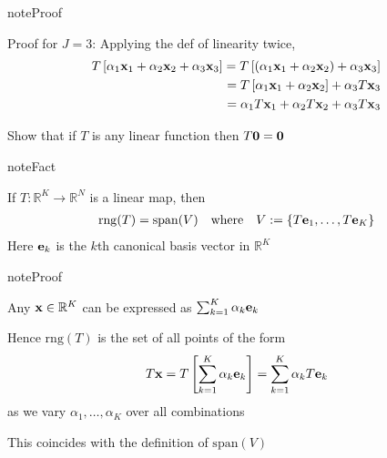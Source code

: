 \documentclass[letterpaper,10pt,english]{jupyterBook}
\begin{document}
\begin{sphinxadmonition}{note}{Proof}

\sphinxAtStartPar
Proof for \(J=3\): Applying the def of linearity twice,
\begin{equation*}
\begin{split}
%
T
\left[ \alpha_1 {\bf x}_1 + \alpha_2 {\bf x}_2 + \alpha_3 {\bf x}_3 \right]
= T\left[ (\alpha_1 {\bf x}_1 + \alpha_2 {\bf x}_2) + \alpha_3 {\bf x}_3 \right]
\\
= T\left[ \alpha_1 {\bf x}_1 + \alpha_2 {\bf x}_2 \right] + \alpha_3 T {\bf x}_3 
\\
= \alpha_1 T {\bf x}_1 + \alpha_2 T {\bf x}_2 + \alpha_3 T {\bf x}_3 
%
\end{split}
\end{equation*}\end{sphinxadmonition}

\sphinxAtStartPar
{} Show that if \(T\) is any linear function then \(T{\bf 0} = {\bf 0}\)

\begin{sphinxadmonition}{note}{Fact}

\sphinxAtStartPar
If \(T \colon \mathbb{R}^K \to \mathbb{R}^N\) is a linear map, then
\begin{equation*}
\begin{split}
%
\mathrm{rng}(T) = \mathrm{span}(V) 
\quad \text{where} \quad
V := \{T{\bf e}_1, \ldots, T{\bf e}_K\}
%
\end{split}
\end{equation*}
\sphinxAtStartPar
Here \({\bf e}_k\) is the \(k\)\sphinxhyphen{}th canonical basis vector in \(\mathbb{R}^K\)
\end{sphinxadmonition}

\begin{sphinxadmonition}{note}{Proof}

\sphinxAtStartPar
Any \({\bf x} \in \mathbb{R}^K\) can be expressed as \(\sum_{k=1}^K \alpha_k {\bf e}_k\)

\sphinxAtStartPar
Hence \(\mathrm{rng}(T)\) is the set of all points of the form
\begin{equation*}
\begin{split}
%
T{\bf x}
= T \left[ \sum_{k=1}^K \alpha_k {\bf e}_k \right]
= \sum_{k=1}^K \alpha_k T {\bf e}_k 
%
\end{split}
\end{equation*}
\sphinxAtStartPar
as we vary \(\alpha_1, \ldots, \alpha_K\) over all combinations

\sphinxAtStartPar
This coincides with the definition of \(\mathrm{span}(V)\)
\end{sphinxadmonition}
\end{document}
